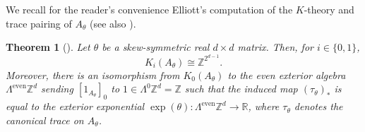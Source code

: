 \documentclass[11pt,a4paper,leqno]{amsart}
\newtheorem{thm}{Theorem}[section]
\theoremstyle{definition}
\theoremstyle{remark}
\numberwithin{equation}{section}
\theoremstyle{plain}
\newcommand{\Zb}{\mathbb{Z}}
\newcommand{\Rb}{\mathbb{R}}
\begin{document}
We recall for the reader's convenience Elliott's computation of the $K$-theory and trace pairing of $A_\theta$ \cite{Ell84} (see also \cite{Rie88}). 

\begin{thm}[{\cite{Ell84}}]\label{T-Ell}
	Let $\theta$ be a skew-symmetric real $d\times d$ matrix. Then, for $i\in \{0,1\}$,  
	\[
		K_i(A_\theta) \cong \Zb^{2^{d-1}}.	
	\]
	Moreover, there is an isomorphism from $K_0(A_\theta)$ to the even exterior algebra $\Lambda^{\mathrm{even}}\Zb^d$ sending $[1_{A_{\theta}}]_0$ to $1\in \Lambda^0\Zb^d = \Zb$ such that the induced map $(\tau_\theta)_*$ is equal to the exterior exponential $\exp(\theta) : \Lambda^{\mathrm{even}}\Zb^d \to \Rb$, where $\tau_\theta$ denotes the canonical trace on $A_\theta$. 
\end{thm}
\end{document}
